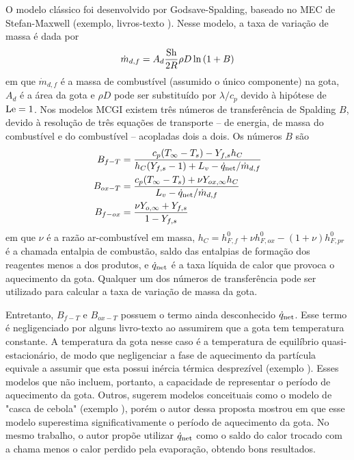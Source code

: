 O modelo clássico foi desenvolvido por Godsave-Spalding, baseado no MEC de Stefan-Maxwell (exemplo, livros-texto \cite{Glassman2008,Law2006,Turns2000}).
Nesse modelo, a taxa de variação de massa é dada por
\begin{equation}
    \dot m_{d,f} = A_d \frac{\mathrm{Sh}}{2R} \rho D \ln{(1 + B)} \label{eq:m_evap_B_M_2}
\end{equation}
em que $\dot m_{d,f}$ é a massa de combustível (assumido o único componente) na gota, $A_d$ é a área da gota e $\rho D$ pode ser substituído por $\lambda/c_p$ devido à hipótese de $\mathrm{Le}=1$.
Nos modelos MCGI existem três números de transferência de Spalding $B$, devido à resolução de três equações de transporte -- de energia, de massa do combustível e do combustível -- acopladas dois a dois.
Os números $B$ são
\begin{align}
    B_{f-T}  &= \frac{c_p(T_\infty - T_s) - Y_{f,s} h_C}{h_C(Y_{f,s} - 1) + L_v - \dot q_{\mathrm{net}}/\dot m_{d,f}} \label{eq:B_fq}\\
    B_{ox-T} &= \frac{c_p(T_\infty - T_s) + \nu Y_{ox,\infty}h_C}{L_v  - \dot q_{\mathrm{net}}/\dot m_{d,f}} \label{eq:B_oq}\\
    B_{f-ox} &= \frac{\nu Y_{o,\infty} + Y_{f,s}}{1 - Y_{f,s}} \label{eq:B_fo}
\end{align}
em que $\nu$ é a razão ar-combustível em massa, $h_C=h^0_{F,f} + \nu h^0_{F,ox} - (1+\nu)h^0_{F,pr}$ é a chamada entalpia de combustão, saldo das entalpias de formação dos reagentes menos a dos produtos, e $\dot q_{\mathrm{net}}$ é a taxa líquida de calor que provoca o aquecimento da gota.
Qualquer um dos números de transferência pode ser utilizado para calcular a taxa de variação de massa da gota.

Entretanto, $B_{f-T}$ e $B_{ox-T}$ possuem o termo ainda desconhecido $\dot q_{\mathrm{net}}$.
Esse termo é negligenciado por alguns livro-texto \cite{Glassman2008,Williams1985} ao assumirem que a gota tem temperatura constante. 
A temperatura da gota nesse caso é a temperatura de equilíbrio quasi-estacionário, de modo que negligenciar a fase de aquecimento da partícula equivale a assumir que esta possui inércia térmica desprezível (exemplo \cite{Turns2000,Glassman2008}). 
Esses modelos que não incluem, portanto, a capacidade de representar o  período de aquecimento da gota.
Outros, sugerem modelos conceituais como o modelo de "casca de cebola" (exemplo \cite[p. 385]{Turns2000}), porém o autor dessa proposta mostrou em \cite{HenningsJ2024MT} que esse modelo superestima significativamente o período de aquecimento da gota.
No mesmo trabalho, o autor propõe utilizar $\dot q_{\mathrm{net}}$ como o saldo do calor trocado com a chama menos o calor perdido pela evaporação, obtendo bons resultados.

